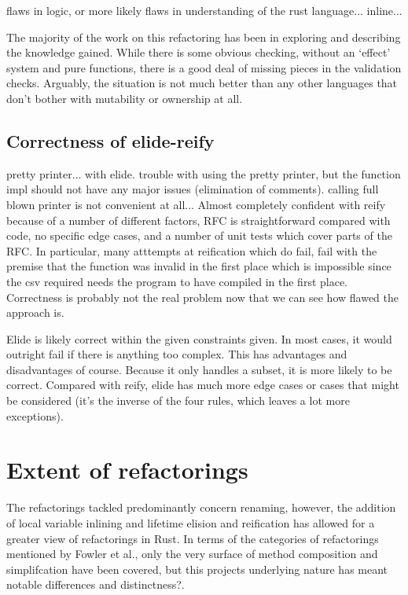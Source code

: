flaws in logic, or more likely flaws in understanding of the rust language... inline...

The majority of the work on this refactoring has been in exploring and describing the knowledge gained. While there is some obvious checking, without an `effect' system and pure functions, there is a good deal of missing pieces in the validation checks. Arguably, the situation is not much better than any other languages that don't bother with mutability or ownership at all.

\subsection{Correctness of elide-reify}
pretty printer... with elide. trouble with using the pretty printer, but the function impl should not have any major issues (elimination of comments). calling full blown printer is not convenient at all...
Almost completely confident with reify because of a number of different factors, RFC is straightforward compared with code, no specific edge cases, and a number of unit tests which cover parts of the RFC. In particular, many atttempts at reification which do fail, fail with the premise that the function was invalid in the first place which is impossible since the csv required needs the program to have compiled in the first place. Correctness is probably not the real problem now that we can see how flawed the approach is.

Elide is likely correct within the given constraints given. In most cases, it would outright fail if there is anything too complex. This has advantages and disadvantages of course. Because it only handles a subset, it is more likely to be correct. Compared with reify, elide has much more edge cases or cases that might be considered (it's the inverse of the four rules, which leaves a lot more exceptions).



\section{Extent of refactorings}

The refactorings tackled predominantly concern renaming, however, the addition of local variable inlining and lifetime elision and reification has allowed for a greater view of refactorings in Rust. In terms of the categories of refactorings mentioned by Fowler et al., only the very surface of method composition and simplifcation have been covered, but this projects underlying nature has meant notable differences and distinctness?. 

